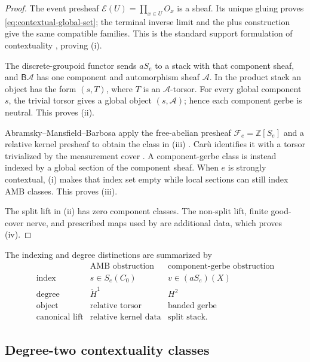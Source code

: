 \begin{proof}
The event presheaf \(\mathcal E(U)=\prod_{x\in U}O_x\) is a sheaf.  Its
unique gluing proves \eqref{eq:contextual-global-set}; the terminal inverse
limit and the plus construction give the same compatible families.  This is
the standard support formulation of contextuality
\cite{AbramskyBrandenburger2011}, proving (i).

The discrete-groupoid functor sends \(aS_e\) to a stack with that component
sheaf, and \(\mathsf B\mathscr A\) has one component and automorphism sheaf
\(\mathscr A\).  In the product stack an object has the form \((s,T)\),
where \(T\) is an \(\mathscr A\)-torsor.  For every global component \(s\),
the trivial torsor gives a global object \((s,\mathscr A)\); hence each
component gerbe is neutral.  This proves (ii).

Abramsky--Mansfield--Barbosa apply the free-abelian presheaf
\(\mathcal F_e=\mathbb Z[S_e]\) and a relative kernel presheaf to obtain the
class in (iii) \cite[Sec.~4]{AbramskyMansfieldSoaresBarbosa2012}.  Car\`u
identifies it with a torsor trivialized by the measurement cover
\cite[Prop.~6.3]{Caru2017}.  A component-gerbe class is instead indexed by a
global section of the component sheaf.  When \(e\) is strongly contextual,
(i) makes that index set empty while local sections can still index AMB
classes.  This proves (iii).

The split lift in (ii) has zero component classes.  The non-split lift,
finite good-cover nerve, and prescribed maps used by
 are additional data, which
proves (iv).
\end{proof}

The indexing and degree distinctions are summarized by
\[
\begin{array}{c|c|c}
 &\text{AMB obstruction}&\text{component-gerbe obstruction}\\ \hline
\text{index}&s\in S_e(C_0)&v\in(aS_e)(X)\\
\text{degree}&\check H^1&H^2\\
\text{object}&\text{relative torsor}&\text{banded gerbe}\\
\text{canonical lift}&\text{relative kernel data}&\text{split stack.}
\end{array}
\]

\subsection*{Degree-two contextuality classes}


